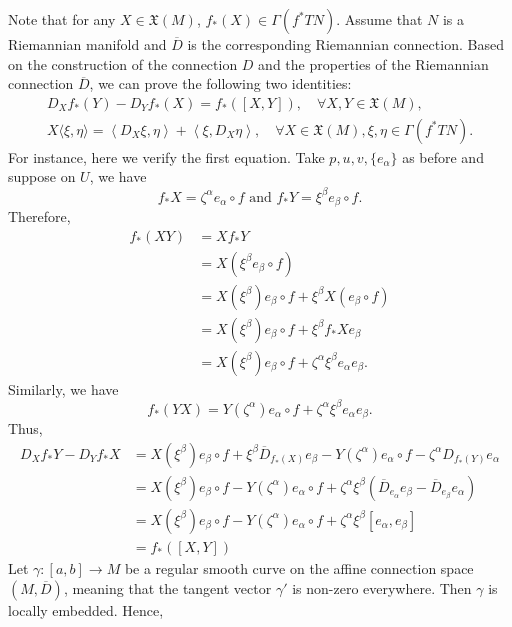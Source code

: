 \documentclass{ctexart}
\begin{document}
Note that for any $X \in \mathfrak{X}(M)$, $f_*(X) \in \Gamma(f^* TN)$. Assume that $N$ is a Riemannian manifold and 
$\overline{D}$ is the corresponding Riemannian connection. Based on the construction of the connection $D$ and 
the properties of the Riemannian connection $\overline{D}$, we can prove the following two identities:
\begin{align*}
D_X f_*(Y) - D_Y f_*(X) = f_*([X, Y]), \quad \forall X, Y \in \mathfrak{X}(M), \\
X\langle\xi, \eta\rangle = \left\langle D_X \xi, \eta\right\rangle + \left\langle\xi, D_X \eta\right\rangle, 
\quad \forall X \in \mathfrak{X}(M), \xi, \eta \in \Gamma(f^* TN).
\end{align*}
For instance, here we verify the first equation. Take $p, u, v, \{e_\alpha\}$ as before and suppose on $U$, we have
$$
f_* X=\zeta^\alpha e_\alpha \circ f \text { and } f_* Y=\xi^\beta e_\beta \circ f. 
$$
Therefore,
$$
\begin{aligned}
f_*(XY) 
& =X f_* Y \\
& =X\left(\xi^\beta e_\beta \circ f\right) \\
& =X\left(\xi^\beta\right) e_\beta \circ f+\xi^\beta X\left(e_\beta \circ f\right) \\
& =X\left(\xi^\beta\right) e_\beta \circ f+\xi^\beta f_* X e_\beta \\
& =X\left(\xi^\beta\right) e_\beta \circ f+\zeta^\alpha \xi^\beta e_\alpha e_\beta .
\end{aligned}
$$
Similarly, we have
$$
f_*(Y X)=Y\left(\zeta^\alpha\right) e_\alpha \circ f+\zeta^\alpha \xi^\beta e_\alpha e_\beta .
$$
Thus,
$$
\begin{aligned}
D_X f_* Y-D_Y f_* X & =X\left(\xi^\beta\right) e_\beta \circ f+\xi^\beta \overline{D}_{f_*(X)} e_\beta - 
Y\left(\zeta^\alpha\right) e_\alpha \circ f-\zeta^\alpha D_{f_*(Y)} e_\alpha \\
& =X\left(\xi^\beta\right) e_\beta \circ f-Y\left(\zeta^\alpha\right) e_\alpha \circ f+\zeta^\alpha \xi^\beta\left(\overline{D}_{e_\alpha} e_\beta-\overline{D}_{e_\beta} e_\alpha\right) \\
& =X\left(\xi^\beta\right) e_\beta \circ f-Y\left(\zeta^\alpha\right) e_\alpha \circ f+\zeta^\alpha \xi^\beta\left[e_\alpha, e_\beta\right] \\
& =f_*([X, Y])
\end{aligned}
$$
Let $\gamma: [a, b] \rightarrow M$ be a regular smooth curve on the affine connection space $(M, \overline{D})$, 
meaning that the tangent vector $\gamma'$ is non-zero everywhere. Then $\gamma$ is locally embedded. Hence, 
\end{document}
